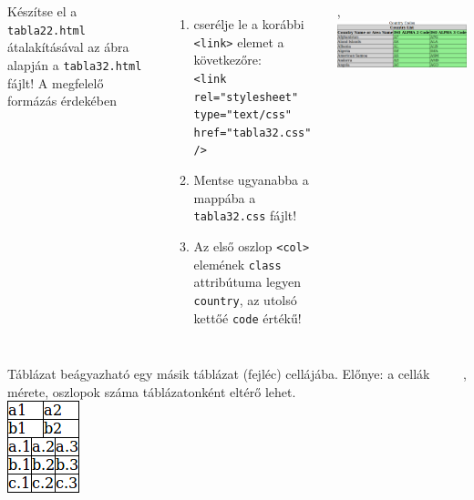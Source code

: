 \begin{frame}
  \begin{columns}[c]
      Készítse el a \texttt{tabla22.html} átalakításával az ábra alapján a \texttt{tabla32.html} fájlt! 
      A megfelelő formázás érdekében 
      \begin{enumerate}
        \item cserélje le a korábbi \texttt{<link>} elemet a következőre:\\
          \texttt{<link rel="stylesheet" type="text/css" href="tabla32.css" />}
        \item Mentse ugyanabba a mappába a \texttt{tabla32.css} fájlt!
        \item Az első oszlop \texttt{<col>} elemének \texttt{class} attribútuma 
          legyen \texttt{country}, az utolsó kettőé \texttt{code} értékű!
      \end{enumerate}
      \begin{exampleblock}{, }
        \centering \includegraphics[width=\textwidth]{tabla32.png}
      \end{exampleblock}
  \end{columns} 
\end{frame}

\begin{frame}
  \begin{columns}[c]
      \footnotesize
      Táblázat beágyazható egy másik táblázat (fejléc) cellájába. Előnye: a cellák mérete, 
      oszlopok száma táblázatonként eltérő lehet.\\
      \medskip
      \centering \includegraphics[scale=.75]{tabla4.png}
      \begin{exampleblock}{, }
        \scriptsize
        
      \end{exampleblock}
  \end{columns} 
\end{frame}

